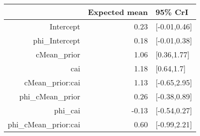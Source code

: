\begin{tabular}{rrl}
  \hline
 & Expected mean & 95\% CrI \\ 
  \hline
Intercept & 0.23 & [-0.01,0.46] \\ 
  phi\_Intercept & 0.18 & [-0.01,0.38] \\ 
  cMean\_prior & 1.06 & [0.36,1.77] \\ 
  cai & 1.18 & [0.64,1.7] \\ 
  cMean\_prior:cai & 1.13 & [-0.65,2.95] \\ 
  phi\_cMean\_prior & 0.26 & [-0.38,0.89] \\ 
  phi\_cai & -0.13 & [-0.54,0.27] \\ 
  phi\_cMean\_prior:cai & 0.60 & [-0.99,2.21] \\ 
   \hline
\end{tabular}

